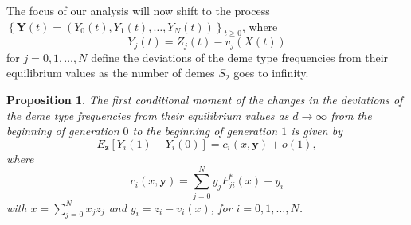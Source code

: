 \documentclass[11pt]{article}
\newtheorem{Proposition}{Proposition}
\begin{document}
The focus of our analysis will now shift to the  process $\left\{\mathbf{Y}(t)=\left(Y_0(t),Y_1(t),\ldots,Y_N(t)\right)\right\}_{t\geq 0}$, where 
 \begin{equation}
 Y_j(t)=Z_j(t)-v_j(X(t))
 \end{equation}
 for $j=0,1,\ldots,N$ define the deviations of the deme type frequencies from their equilibrium values as the number of demes $S_2$ goes to infinity.


\begin{Proposition}\label{Proposition4}
The first conditional moment of the changes in the deviations of the deme type frequencies from their equilibrium values as $d\rightarrow \infty$ from the beginning of generation $0$ to the beginning of generation $1$ is given by
\begin{equation}\label{sec2-eq40}
E_{\mathbf{z}}\left[Y_i(1)-Y_i(0)\right]=c_i(x,\mathbf{y})+o\left(1\right),
\end{equation}
where
\begin{equation}\label{sec2-eq41}
c_i(x,\mathbf{y})=\sum_{j=0}^{N}y_jP_{ji}^*(x)-y_i
\end{equation}
with $x=\sum_{j=0}^N x_jz_j$ and $y_i= z_i - v_i(x)$, for $i=0,1,\ldots,N$.
\end{Proposition}
\end{document}
